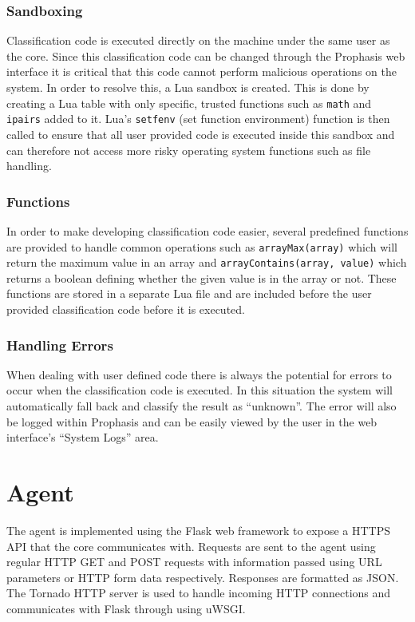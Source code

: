 \documentclass[bsc,logo,twoside,parskip,singlespacing,notimes]{infthesis}
\begin{document}
\subsubsection{Sandboxing}
\label{classification_sandboxing}

	Classification code is executed directly on the machine under the same user as
	the core.  Since this classification code can be changed through the Prophasis
	web interface it is critical that this code cannot perform malicious operations
	on the system.  In order to resolve this, a Lua sandbox is created.  This is
	done by creating a Lua table with only specific, trusted functions such as
	\texttt{math} and \texttt{ipairs} added to it.  Lua's \texttt{setfenv} (set
	function environment) function is then called to ensure that all user provided
	code is executed inside this sandbox and can therefore not access more risky
	operating system functions such as file handling.

\subsubsection{Functions}

	In order to make developing classification code easier, several predefined
	functions are provided to handle common operations such as
	\texttt{arrayMax(array)} which will return the maximum value in an array and
	\texttt{arrayContains(array, value)} which returns a boolean defining whether
	the given value is in the array or not.  These functions are stored in a
	separate Lua file and are included before the user provided classification code
	before it is executed.

\subsubsection{Handling Errors}

	When dealing with user defined code there is always the potential for errors
	to occur when the classification code is executed.  In this situation the
	system will automatically fall back and classify the result as ``unknown''. The
	error will also be logged within Prophasis and can be easily viewed by the user
	in the web interface's ``System Logs'' area.

\section{Agent}

	The agent is implemented using the Flask web framework to expose a HTTPS API
	that the core communicates with.  Requests are sent to the agent using regular
	HTTP GET and POST requests with information passed using URL parameters or HTTP
	form data respectively.  Responses are formatted as JSON.  The Tornado HTTP
	server is used to handle incoming HTTP connections and communicates with Flask
	through using uWSGI.
\end{document}
